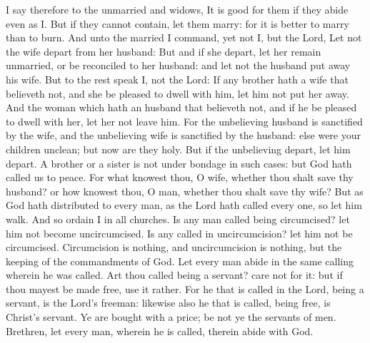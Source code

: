  I say therefore to the unmarried and widows, It is good
for them if they abide even as I.  But if they cannot
contain, let them marry: for it is better to marry than to burn.
 And unto the married I command, yet not I, but the Lord,
Let not the wife depart from her husband:  But and if she
depart, let her remain unmarried, or be reconciled to her husband: and
let not the husband put away his wife.  But to the rest
speak I, not the Lord: If any brother hath a wife that believeth not,
and she be pleased to dwell with him, let him not put her away.
 And the woman which hath an husband that believeth not,
and if he be pleased to dwell with her, let her not leave him.
 For the unbelieving husband is sanctified by the wife,
and the unbelieving wife is sanctified by the husband: else were your
children unclean; but now are they holy.  But if the
unbelieving depart, let him depart. A brother or a sister is not under
bondage in such cases: but God hath called us to peace. 
For what knowest thou, O wife, whether thou shalt save thy husband? or
how knowest thou, O man, whether thou shalt save thy wife?
 But as God hath distributed to every man, as the Lord
hath called every one, so let him walk. And so ordain I in all churches.
 Is any man called being circumcised? let him not become
uncircumcised. Is any called in uncircumcision? let him not be
circumcised.  Circumcision is nothing, and uncircumcision
is nothing, but the keeping of the commandments of God. 
Let every man abide in the same calling wherein he was called.
 Art thou called being a servant? care not for it: but if
thou mayest be made free, use it rather.  For he that is
called in the Lord, being a servant, is the Lord's freeman: likewise
also he that is called, being free, is Christ's servant. 
Ye are bought with a price; be not ye the servants of men.
 Brethren, let every man, wherein he is called, therein
abide with God.


